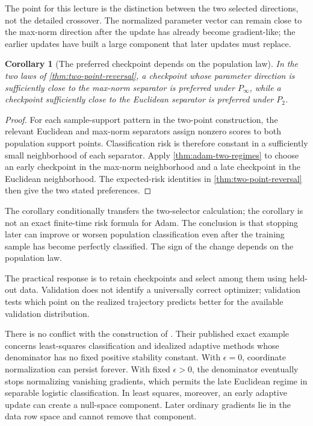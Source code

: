 \documentclass[11pt,twoside]{article}
\newtheorem{corollary}[theorem]{Corollary}
\theoremstyle{definition}
\theoremstyle{remark}
\begin{document}
The point for this lecture is the distinction between the two selected
directions, not the detailed crossover. The normalized parameter vector can
remain close to the max-norm direction after the update has already become
gradient-like; the earlier updates have built a large component that later
updates must replace.

\begin{corollary}[The preferred checkpoint depends on the population law]
\label{cor:adam-risk}
In the two laws of \cref{thm:two-point-reversal}, a checkpoint whose parameter
direction is sufficiently close to the max-norm separator is preferred under
$P_\infty$, while a checkpoint sufficiently close to the Euclidean separator
is preferred under $P_2$.
\end{corollary}

\begin{proof}
For each sample-support pattern in the two-point construction, the relevant
Euclidean and max-norm separators assign nonzero scores to both population
support points. Classification risk is therefore constant in a sufficiently
small neighborhood of each separator. Apply \cref{thm:adam-two-regimes} to
choose an early checkpoint in the max-norm neighborhood and a late checkpoint
in the Euclidean neighborhood. The expected-risk identities in
\cref{thm:two-point-reversal} then give the two stated preferences.
\end{proof}

The corollary conditionally transfers the two-selector calculation; the
corollary is not an exact finite-time risk formula for Adam. The conclusion
is that stopping later can
improve or worsen population classification even after the training sample
has become perfectly classified. The sign of the change depends on the
population law.

The practical response is to retain checkpoints and select among them using
held-out data. Validation does not identify a universally correct optimizer;
validation tests which point on the realized trajectory predicts better for the
available validation distribution.

There is no conflict with the construction of \citet{wilson2017}. Their
published exact example concerns least-squares classification and idealized
adaptive methods whose denominator has no fixed positive stability constant.
With $\epsilon=0$, coordinate normalization can persist forever. With fixed
$\epsilon>0$, the denominator eventually stops normalizing vanishing
gradients, which permits the late Euclidean regime in separable logistic
classification. In least squares, moreover, an early adaptive update can
create a null-space component. Later ordinary gradients lie in the data row
space and cannot remove that component.
\end{document}

